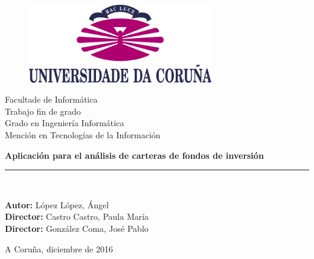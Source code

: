 \documentclass[12pt, a4paper]{article}
\begin{document}
\begin{titlepage}

\begin{center}
\vspace*{-1in}
\begin{figure}[htb]
\begin{center}
\includegraphics[width=8cm]{figuras/logo.png}
\end{center}
\end{figure}
\vspace*{0.6in}
{\Large Facultade de Informática}\\[1.25cm]
\vspace*{0.15in}
{\LARGE Trabajo fin de grado}\\[0.75cm]
{\LARGE  Grado en Ingeniería Informática}\\[0.5cm]
{Mención en Tecnologías de la Información }\\[1.25cm]
\vspace*{0.6in}
\vspace*{0.2in}
\begin{Large}
\textbf{Aplicación para el análisis de carteras de fondos de inversión} \\
\end{Large}
\vspace*{2in}
\vspace*{0.3in}
\rule{80mm}{0.1mm}\\
\vspace*{0.1in}
\begin{large}
\textbf{Autor:} López López, Ángel\\
\textbf{Director:} Castro Castro, Paula María\\
\textbf{Director:} González Coma, José Pablo \\
\end{large}
\vspace*{0.3in}
A Coruña, diciembre de 2016
\end{center}

\end{titlepage}

\newpage
\tableofcontents
\newpage

\end{document}
